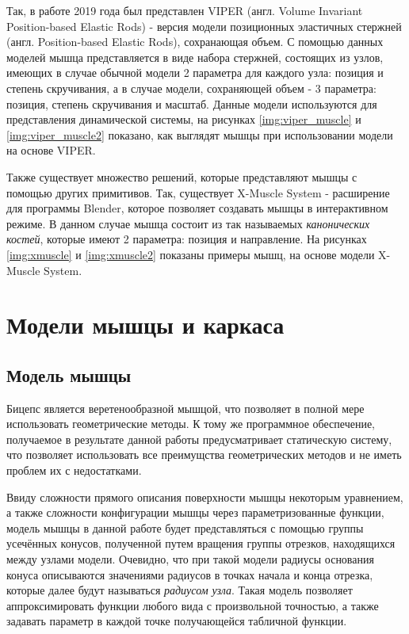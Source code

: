 Так, в работе 2019 года был представлен VIPER\cite{viper} (англ. Volume Invariant Position-based Elastic Rods) - версия модели позиционных эластичных стержней\cite{per} (англ. Position-based Elastic Rods), сохранающая объем. С помощью данных моделей мышца представляется в виде набора стержней, состоящих из узлов, имеющих в случае обычной модели 2 параметра для каждого узла: позиция и степень скручивания, а в случае модели, сохраняющей объем - 3 параметра: позиция, степень скручивания и масштаб. Данные модели используются для представления динамической системы, на рисунках \ref{img:viper_muscle} и \ref{img:viper_muscle2} показано, как выглядят мышцы при использовании модели на основе VIPER.



Также существует множество решений, которые представляют мышцы с помощью других примитивов. Так, существует X-Muscle System\cite{xms} - расширение для программы Blender\cite{blender}, которое позволяет создавать мышцы в интерактивном режиме. В данном случае мышца состоит из так называемых \textit{канонических костей}, которые имеют 2 параметра: позиция и направление. На рисунках \ref{img:xmuscle} и \ref{img:xmuscle2} показаны примеры мышц, на основе модели X-Muscle System.



\section{Модели мышцы и каркаса}

\subsection{Модель мышцы}

Бицепс является веретенообразной мышцой, что позволяет в полной мере использовать геометрические методы. К тому же программное обеспечение, получаемое в результате данной работы предусматривает статическую систему, что позволяет использовать все преимущства геометрических методов и не иметь проблем их с недостатками.

Ввиду сложности прямого описания поверхности мышцы некоторым уравнением, а также сложности конфигурации мышцы через параметризованные функции, модель мышцы в данной работе будет представляться с помощью группы усечённых конусов, полученной путем вращения группы отрезков, находящихся между узлами модели. Очевидно, что при такой модели радиусы основания конуса описываются значениями радиусов в точках начала и конца отрезка, которые далее будут называться \textit{радиусом узла}. Такая модель позволяет аппроксимировать функции любого вида с произвольной точностью, а также задавать параметр в каждой точке получающейся табличной функции.

